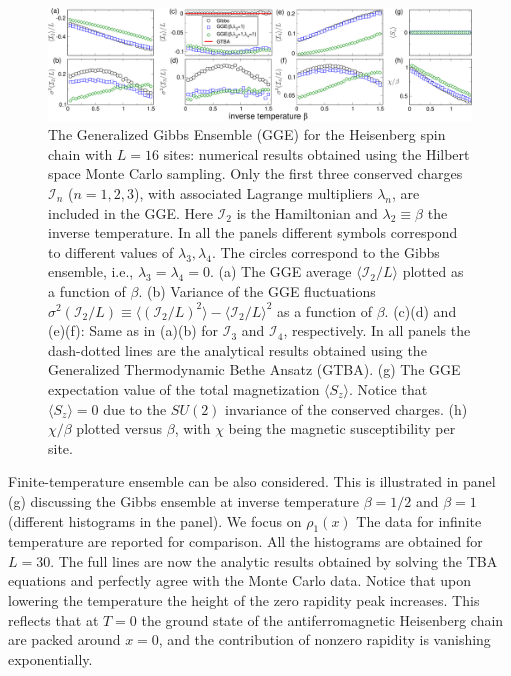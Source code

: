 \documentclass[twocolumn,superscriptaddress,prb,10pt]{revtex4-1}
\begin{document}
\begin{figure}[t]
\includegraphics*[width=0.93\linewidth]{./draft_figs/fig1}
\caption{The Generalized Gibbs Ensemble (GGE) for the Heisenberg spin chain with 
 $L=16$ sites: numerical results obtained using the Hilbert space Monte 
 Carlo sampling. Only the first three conserved charges ${\mathcal I}_n$ ($n=1,2,3$), 
 with associated Lagrange multipliers $\lambda_n$, are included in the GGE. Here 
 ${\mathcal I}_2$ is the Hamiltonian and $\lambda_2\equiv\beta$ the inverse 
 temperature. In all the panels different symbols correspond to different  values 
 of $\lambda_3,\lambda_4$. The circles correspond to the Gibbs ensemble, i.e., 
 $\lambda_3=\lambda_4=0$. (a) The GGE average $\langle {\mathcal I}_2/L\rangle$ 
 plotted as a function of $\beta$. (b) Variance of the GGE fluctuations $\sigma^2(
 {\mathcal I}_2/L)\equiv \langle ({\mathcal I}_2/L)^2\rangle-\langle {\mathcal I}_2/L
 \rangle^2$ as a function of $\beta$. (c)(d) and (e)(f): Same as in (a)(b) for 
 ${\mathcal I}_3$ and ${\mathcal I}_4$, respectively. In all panels the dash-dotted 
 lines  are the analytical results obtained using the Generalized Thermodynamic Bethe 
 Ansatz (GTBA). (g) The GGE expectation value of the total magnetization 
 $\langle S_z\rangle$. Notice that $\langle S_z\rangle=0$ due to the $SU(2)$ 
 invariance of the conserved charges. (h) $\chi/\beta$ plotted versus $\beta$, with 
 $\chi$ being the magnetic susceptibility per site. 
}
\label{fig1}
\end{figure}


Finite-temperature ensemble can be also considered. This is illustrated in panel (g) 
discussing the Gibbs ensemble at inverse temperature $\beta=1/2$ and $\beta=1$ (different 
histograms in the panel). We focus on $\rho_1(x)$ The data for infinite temperature are 
reported for comparison. All the histograms are obtained for $L=30$. The full lines are now 
the analytic results obtained by solving the TBA equations and perfectly agree with the 
Monte Carlo data. Notice that upon lowering the temperature the height of the zero rapidity 
peak increases. This reflects that at $T=0$ the ground state of the antiferromagnetic 
Heisenberg chain are packed around $x=0$, and the contribution of nonzero rapidity is 
vanishing exponentially. 
\end{document}
